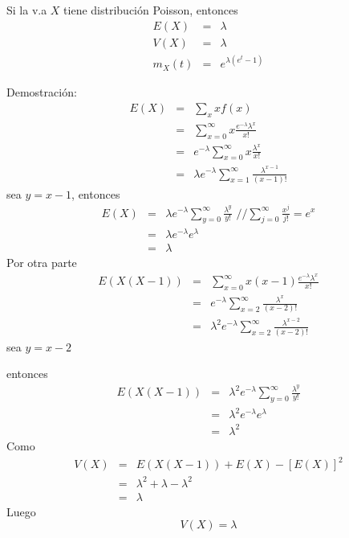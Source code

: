 \begin{i}
\begin{theorem}
Si la v.a $X$ tiene distribución Poisson, entonces
\begin{eqnarray*}
E(X) &=&\lambda \\
V(X) &=&\lambda \\
m_{X}(t) &=&e^{\lambda (e^{t}-1)}
\end{eqnarray*}
\end{theorem}

Demostración:
\begin{eqnarray*}
E(X) &=&\sum_{x}xf(x) \\
&=&\sum_{x=0}^{\infty }x\frac{e^{-\lambda }\lambda ^{x}}{x!} \\
&=&e^{-\lambda }\sum_{x=0}^{\infty }x\frac{\lambda ^{x}}{x!} \\
&=&\lambda e^{-\lambda }\sum_{x=1}^{\infty }\frac{\lambda ^{x-1}}{(x-1)!}
\end{eqnarray*}
sea $y=x-1$, entonces
\begin{eqnarray*}
E(X) &=&\lambda e^{-\lambda }\sum_{y=0}^{\infty }\frac{\lambda ^{y}}{y!}%
\text{ \ \ //}\sum_{j=0}^{\infty }\frac{x^{j}}{j!}=e^{x} \\
&=&\lambda e^{-\lambda }e^{\lambda } \\
&=&\lambda
\end{eqnarray*}
Por otra parte
\begin{eqnarray*}
E(X(X-1)) &=&\sum_{x=0}^{\infty }x(x-1)\frac{e^{-\lambda }\lambda ^{x}}{x!}
\\
&=&e^{-\lambda }\sum_{x=2}^{\infty }\frac{\lambda ^{x}}{(x-2)!} \\
&=&\lambda ^{2}e^{-\lambda }\sum_{x=2}^{\infty }\frac{\lambda ^{x-2}}{(x-2)!}
\end{eqnarray*}
sea $y=x-2$

entonces
\begin{eqnarray*}
E(X(X-1)) &=&\lambda ^{2}e^{-\lambda }\sum_{y=0}^{\infty }\frac{\lambda ^{y}%
}{y!} \\
&=&\lambda ^{2}e^{-\lambda }e^{\lambda } \\
&=&\lambda ^{2}
\end{eqnarray*}
Como 
\begin{eqnarray*}
V(X) &=&E(X(X-1))+E(X)-[E(X)]^{2} \\
&=&\lambda ^{2}+\lambda -\lambda ^{2} \\
&=&\lambda
\end{eqnarray*}
Luego 
\begin{equation*}
V(X)=\lambda
\end{equation*}


\end{i}
